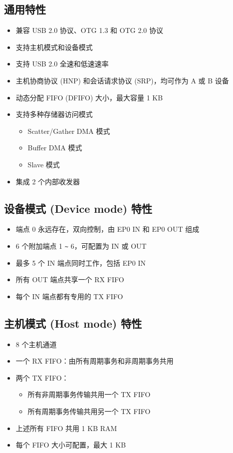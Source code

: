 \documentclass[main\_\_CN.tex]{subfiles}
\begin{document}
\subsection{通用特性}
\begin{itemize}
    \item 兼容 USB 2.0 协议、OTG 1.3 和 OTG 2.0 协议
    \item 支持主机模式和设备模式
    \item 支持 USB 2.0 全速和低速速率
    \item 主机协商协议 (HNP) 和会话请求协议 (SRP)，均可作为 A 或 B 设备
    \item 动态分配 FIFO (DFIFO) 大小，最大容量 1 KB
    \item 支持多种存储器访问模式
    \begin{itemize}
        \item Scatter/Gather DMA 模式
        \item Buffer DMA 模式
        \item Slave 模式
    \end{itemize}
    \item 集成 2 个内部收发器
\end{itemize}

\subsection{设备模式 (Device mode) 特性}

\begin{itemize}
    \item 端点 0 永远存在，双向控制，由 EP0 IN 和 EP0 OUT 组成
    \item 6 个附加端点 1 \verb+~+ 6，可配置为 IN 或 OUT
    \item 最多 5 个 IN 端点同时工作，包括 EP0 IN
    \item 所有 OUT 端点共享一个 RX FIFO
    \item 每个 IN 端点都有专用的 TX FIFO
\end{itemize}

\subsection{主机模式 (Host mode) 特性}

\begin{itemize}
    \item 8 个主机通道
    \item 一个 RX FIFO：由所有周期事务和非周期事务共用
    \item 两个 TX FIFO：
    \begin{itemize}
        \item 所有非周期事务传输共用一个 TX FIFO
        \item 所有周期事务传输共用另一个 TX FIFO
    \end{itemize}
    \item 上述所有 FIFO 共用 1 KB RAM
    \item 每个 FIFO 大小可配置，最大 1 KB
\end{itemize}
\end{document}
